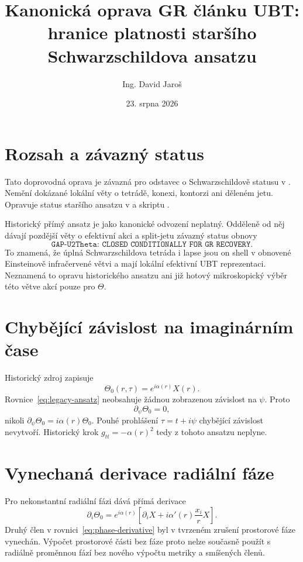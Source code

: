 \documentclass[11pt,a4paper]{article}
\title{Kanonická oprava GR článku UBT:\\
hranice platnosti staršího Schwarzschildova ansatzu}
\author{Ing. David Jaro\v{s}}
\date{23. srpna 2026}
\begin{document}
\maketitle
\UBTProvenanceNotice

\section{Rozsah a závazný status}
Tato doprovodná oprava je závazná pro odstavec o Schwarzschildově statusu v
. Nemění dokázané lokální věty o tetrádě,
konexi, kontorzi ani děleném jetu. Opravuje status staršího ansatzu v
 a skriptu
.

Historický přímý ansatz je jako kanonické odvození neplatný. Odděleně od něj
dávají pozdější věty o efektivní akci a split-jetu závazný status obnovy
\[
 \boxed{\texttt{GAP-U2Theta: CLOSED CONDITIONALLY FOR GR RECOVERY}.}
\]
To znamená, že úplná Schwarzschildova tetráda i lapse jsou on shell v obnovené
Einsteinově infračervené větvi a mají lokální efektivní UBT reprezentaci.
Neznamená to opravu historického ansatzu ani již hotový mikroskopický výběr této
větve akcí pouze pro $\Theta$.

\section{Chybějící závislost na imaginárním čase}
Historický zdroj zapisuje
\begin{equation}
 \Theta_0(r,\tau)=e^{i\alpha(r)}X(r).
 \label{eq:legacy-ansatz}
\end{equation}
Rovnice~\eqref{eq:legacy-ansatz} neobsahuje žádnou zobrazenou závislost na
$\psi$. Proto
\begin{equation}
 \partial_\psi\Theta_0=0,
 \label{eq:psi-zero}
\end{equation}
nikoli $\partial_\psi\Theta_0=i\alpha(r)\Theta_0$. Pouhé prohlášení
$\tau=t+i\psi$ chybějící závislost nevytvoří. Historický krok
$g_{tt}=-\alpha(r)^2$ tedy z tohoto ansatzu neplyne.

\section{Vynechaná derivace radiální fáze}
Pro nekonstantní radiální fázi dává přímá derivace
\begin{equation}
 \partial_i\Theta_0=e^{i\alpha(r)}\left[
 \partial_iX+i\alpha'(r)\frac{x_i}{r}X\right].
 \label{eq:phase-derivative}
\end{equation}
Druhý člen v rovnici~\eqref{eq:phase-derivative} byl v tvrzeném zrušení
prostorové fáze vynechán. Výpočet prostorové části bez fáze proto nelze
současně použít s radiálně proměnnou fází bez nového výpočtu metriky a
smíšených členů.
\end{document}
